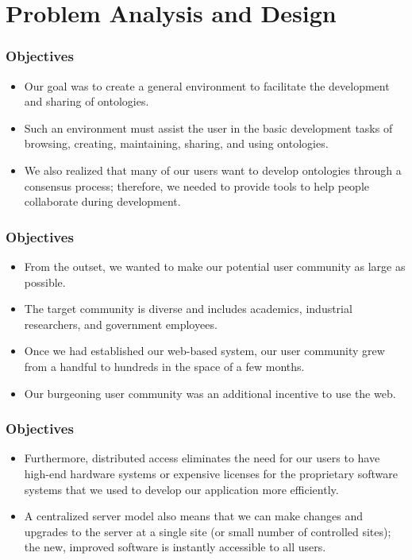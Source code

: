 \documentclass{beamer}
\begin{document}
\section[Problem Analysis and Design]{Problem Analysis and Design}


\begin{frame}
\frametitle{Objectives}

\begin{itemize}
\item Our goal was to create a general environment to facilitate the development and sharing of ontologies.
\item Such an environment must assist the user in the basic development tasks of browsing, creating, maintaining, sharing, and using ontologies.
\item We also realized that many of our users want to develop ontologies through a consensus process; therefore, we needed to provide tools to help people collaborate during development.
\end{itemize}

\end{frame}

\begin{frame}
\frametitle{Objectives}

\begin{itemize}
\item From the outset, we wanted to make our potential user community as large as possible.
\item The target community is diverse and includes academics, industrial researchers, and government employees.
\item Once we had established our web-based system, our user community grew from a handful to hundreds in the space of a few months.
\item Our burgeoning user community was an additional incentive to use the web.
\end{itemize}

\end{frame}

\begin{frame}
\frametitle{Objectives}

\begin{itemize}
\item Furthermore, distributed access eliminates the need for our users to have high-end hardware systems or expensive licenses for the proprietary software systems that we used to develop our application more efficiently.
\item A centralized server model also means that we can make changes and upgrades to the server at a single site (or small number of controlled sites); the new, improved software is instantly accessible to all users.
\end{itemize}

\end{frame}
\end{document}
